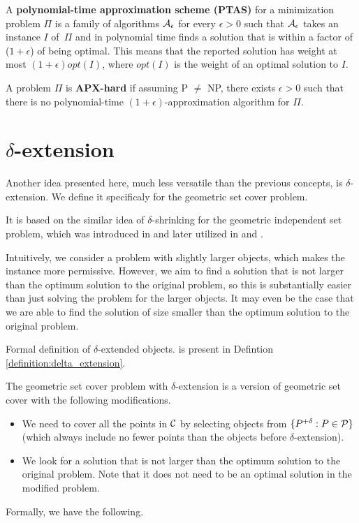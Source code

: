 \begin{defi}
A \textbf{polynomial-time approximation scheme (PTAS)}
for a minimization problem $\Pi$
is a family of algorithms $\cal{A}_\epsilon$ for
every $\epsilon > 0$
such that $\cal{A}_\epsilon$ takes an instance $I$ of~$\Pi$
and in polynomial time
finds a solution that is within a factor
of ($1+\epsilon$) of being optimal.
This means that the reported solution has weight at most
$(1+\epsilon)opt(I)$, where $opt(I)$ is the weight
of an optimal solution to $I$.
\end{defi}

\begin{defi}
A problem $\Pi$ is \textbf{APX-hard} if assuming P $\neq$ NP,
there exists $\epsilon > 0$
such that there is no polynomial-time $(1+\epsilon)$-approximation algorithm
for $\Pi$.
\end{defi}

\section{$\delta$-extension}

Another idea presented here, much less versatile than the previous concepts,
is $\delta$-extension.
We define it specificaly for the geometric set cover problem.

It is based on the similar idea of $\delta$-shrinking
for the geometric independent set problem,
which was introduced in \cite{shrinking_original} and later utilized in
\cite{shriking1} and \cite{shrinking2}.

Intuitively, we consider a problem with slightly larger objects,
which makes the instance more permissive.
However, we aim to find a solution that
is not larger than the
optimum solution to the original problem,
so this is substantially easier than just
solving the problem for the larger objects.
It may even be the case
that we are able to find the solution
of size smaller than the optimum solution
to the original problem.

Formal definition of $\delta$-extended objects.
is present in Defintion
\ref{definition:delta_extension}.

The geometric set cover problem with $\delta$-extension
is a version of geometric set cover with
the following modifications.
\begin{itemize}
\item We need to cover all the points in $\mathcal{C}$
by selecting objects from $\{P^{+\delta} : P \in \mathcal{P}\}$ (which always 
include no fewer points than the objects
before $\delta$-extension).
\item We look for a solution that is not larger than the optimum
solution to the original problem.
Note that it does not need to be an optimal solution in
the modified problem.
\end{itemize}
Formally, we have the following.

